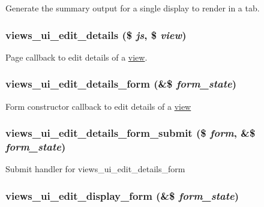 Generate the summary output for a single display to render in a tab. \hypertarget{admin_8inc_44a59c2c2496856a1665b0a1351dbafc}{
\subsubsection[{views\_\-ui\_\-edit\_\-details}]{\setlength{\rightskip}{0pt plus 5cm}views\_\-ui\_\-edit\_\-details (\$ {\em js}, \/  \$ {\em view})}}
\label{admin_8inc_44a59c2c2496856a1665b0a1351dbafc}


Page callback to edit details of a \hyperlink{classview}{view}. \hypertarget{admin_8inc_6d4b9deaef5d0ec9fc6a5185e88f6573}{
\subsubsection[{views\_\-ui\_\-edit\_\-details\_\-form}]{\setlength{\rightskip}{0pt plus 5cm}views\_\-ui\_\-edit\_\-details\_\-form (\&\$ {\em form\_\-state})}}
\label{admin_8inc_6d4b9deaef5d0ec9fc6a5185e88f6573}


Form constructor callback to edit details of a \hyperlink{classview}{view} \hypertarget{admin_8inc_674154b3d2a6a378f121ec2f0a66d52c}{
\subsubsection[{views\_\-ui\_\-edit\_\-details\_\-form\_\-submit}]{\setlength{\rightskip}{0pt plus 5cm}views\_\-ui\_\-edit\_\-details\_\-form\_\-submit (\$ {\em form}, \/  \&\$ {\em form\_\-state})}}
\label{admin_8inc_674154b3d2a6a378f121ec2f0a66d52c}


Submit handler for views\_\-ui\_\-edit\_\-details\_\-form \hypertarget{admin_8inc_f6122919e9513646e5dfeba97114ee35}{
\subsubsection[{views\_\-ui\_\-edit\_\-display\_\-form}]{\setlength{\rightskip}{0pt plus 5cm}views\_\-ui\_\-edit\_\-display\_\-form (\&\$ {\em form\_\-state})}}
\label{admin_8inc_f6122919e9513646e5dfeba97114ee35}


